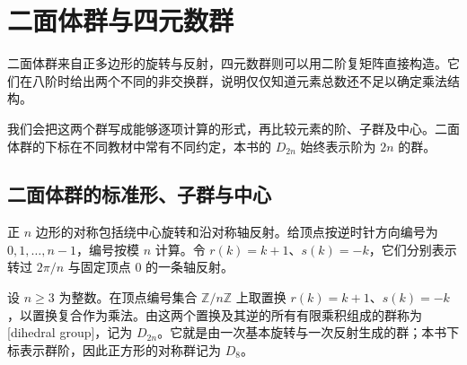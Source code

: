 
\section{二面体群与四元数群}
\label{b1:sec:0303}

%
%

二面体群来自正多边形的旋转与反射，四元数群则可以用二阶复矩阵直接构造。它们在八阶时给出两个不同的非交换群，说明仅仅知道元素总数还不足以确定乘法结构。

\ProseParagraphBreak
我们会把这两个群写成能够逐项计算的形式，再比较元素的阶、子群及中心。二面体群的下标在不同教材中常有不同约定，本书的 \(D_{2n}\) 始终表示阶为 \(2n\) 的群。

\subsection{二面体群的标准形、子群与中心}
\label{b1:subsec:0303:01}

正 \(n\) 边形的对称包括绕中心旋转和沿对称轴反射。给顶点按逆时针方向编号为 \(0,1,\ldots,n-1\)，编号按模 \(n\) 计算。令 \(r(k)=k+1\)、\(s(k)=-k\)，它们分别表示转过 \(2\pi/n\) 与固定顶点 \(0\) 的一条轴反射。

\begin{definition}\label{b1:def:dihedral-group}
	设 \(n\geq3\) 为整数。在顶点编号集合 \(\mathbb Z/n\mathbb Z\) 上取置换 \(r(k)=k+1\)、\(s(k)=-k\)，以置换复合作为乘法。由这两个置换及其逆的所有有限乘积组成的群称为[dihedral group]，记为 \(D_{2n}\)。它就是由一次基本旋转与一次反射生成的群；本书下标表示群阶，因此正方形的对称群记为 \(D_8\)。
\end{definition}

